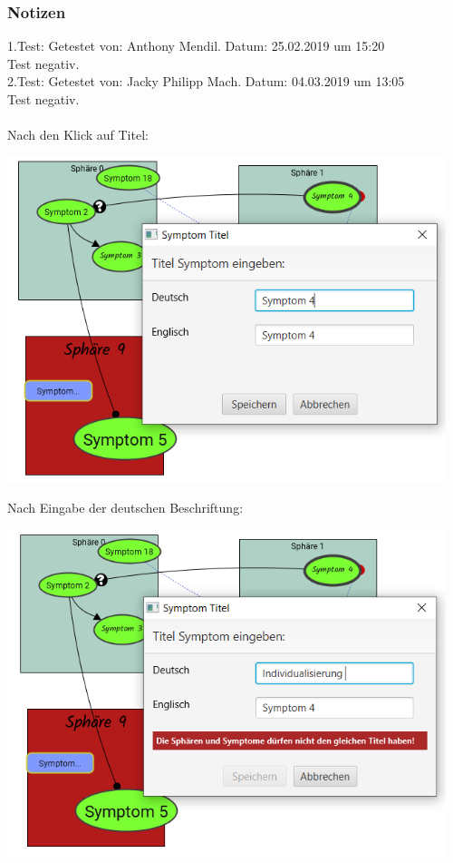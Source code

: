\documentclass[enabledeprecatedfontcommands]{scrartcl}
\begin{document}
\subsubsection{Notizen}
1.Test: Getestet von: Anthony Mendil. Datum: 25.02.2019 um 15:20 \\
Test negativ. \\
2.Test: Getestet von: Jacky Philipp Mach. Datum: 04.03.2019 um 13:05 \\
Test negativ.\\\\
\newpage
Nach den Klick auf Titel: 
\begin{center}
\includegraphics[height=9.5cm]{3_46vorher.PNG}
\end{center}
Nach Eingabe der deutschen Beschriftung:
\begin{center}
\includegraphics[height=9.5cm]{3_46nachher.PNG}
\end{center}
\end{document}
